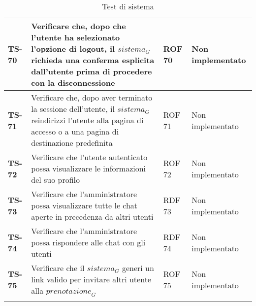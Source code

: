 \begin{longtable}{|>{\centering\arraybackslash}p{1.5cm}|p{9.8cm}|p{2cm}|p{3.5cm}|}
    \hline
    \rowcolor{gray!10}
    \textbf{TS-70} & Verificare che, dopo che l'utente ha selezionato l'opzione di logout, il $\textit{sistema}_G$ richieda una conferma esplicita dall'utente prima di procedere con la disconnessione & ROF 70 & Non implementato \\ 
    \hline
    \rowcolor{gray!10}
    \textbf{TS-71} & Verificare che, dopo aver terminato la sessione dell'utente, il $\textit{sistema}_G$ reindirizzi l'utente alla pagina di accesso o a una pagina di destinazione predefinita & ROF 71 & Non implementato \\ 
    \hline
    \rowcolor{gray!10}
    \textbf{TS-72} & Verificare che l'utente autenticato possa visualizzare le informazioni del suo profilo & ROF 72 & Non implementato \\ 
    \hline
    \rowcolor{gray!10}
    \textbf{TS-73} & Verificare che l'amministratore possa visualizzare tutte le chat aperte in precedenza da altri utenti& RDF 73 & Non implementato \\ 
    \hline
    \rowcolor{gray!10}
    \textbf{TS-74} & Verificare che l'amministratore possa rispondere alle chat con gli utenti & RDF 74 & Non implementato \\ 
    \hline
    \rowcolor{gray!10}
    \textbf{TS-75} & Verificare che il $\textit{sistema}_G$ generi un link valido per invitare altri utente alla $\textit{prenotazione}_G$ & ROF 75 & Non implementato \\
    \hline
    \caption{Test di sistema} 
    \label{tab:test_sistema}
    \end{longtable}
    

